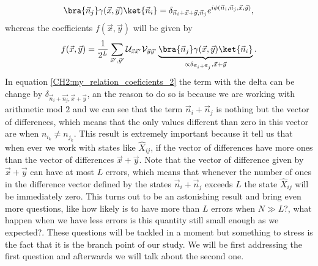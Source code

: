 \begin{equation}
\bra{\vec{n}_j}\gamma(\vec{x},\vec{y})\ket{\vec{n}_i}=\delta_{\vec{n}_i+\vec{x}+\vec{y},\vec{n}_j}e^{i\phi(\vec{n}_i,\vec{n}_j,\vec{x},\vec{y})},
\label{CH2:my_relation_coeficients_2}
\end{equation}
whereas the coefficients $f(\vec{x},\vec{y})$ will be given by
\begin{equation}
f(\vec{x},\vec{y}) = \frac{1}{2^L}\sum_{\vec{x}',\vec{y}'} \mathcal{U}_{\vec{x}\vec{x}'} \mathcal{V}_{\vec{y}\vec{y}'} \underbrace{\bra{\vec{n}_j}\gamma(\vec{x},\vec{y})\ket{\vec{n}_i}}_{\propto \delta_{\vec{n}_i+\vec{n}_j},\vec{x}+\vec{y}}.
\label{CH2:my_Relation_coeffitients_final}
\end{equation}
In equation \eqref{CH2:my_relation_coeficients_2} the term with the delta can be change by $\delta_{\vec{n}_i+\vec{n_j},\vec{x}+\vec{y}}$, an the reason to do so is because we are working with arithmetic mod $2$ and we can see that the term $\vec{n}_i+\vec{n}_j$ is nothing but the vector of differences, which means that the only values different than zero in this vector are when $n_{i_k}\neq n_{j_k}$. This result is extremely important because it tell us that when ever we work with states like $\hat{X}_{ij}$, if the vector of differences have more ones than the vector of differences $\vec{x}+\vec{y}$. Note that the vector of difference given by $\vec{x}+\vec{y}$ can have at most $L$ errors, which means that whenever the number of ones in the difference vector defined by the states $\vec{n}_i+\vec{n}_j$ exceeds $L$ the state $\hat{X}_{ij}$ will be immediately zero. This turns out to be an astonishing result and bring even more questions, like how likely is to have more than $L$ errors when $N\gg L$?, what happen when we have less errors is this quantity still small enough as we expected?. These questions will be tackled in a moment but something to stress is the fact that it is the branch point of our study. We will be first addressing the first question and afterwards we will talk about the second one.
